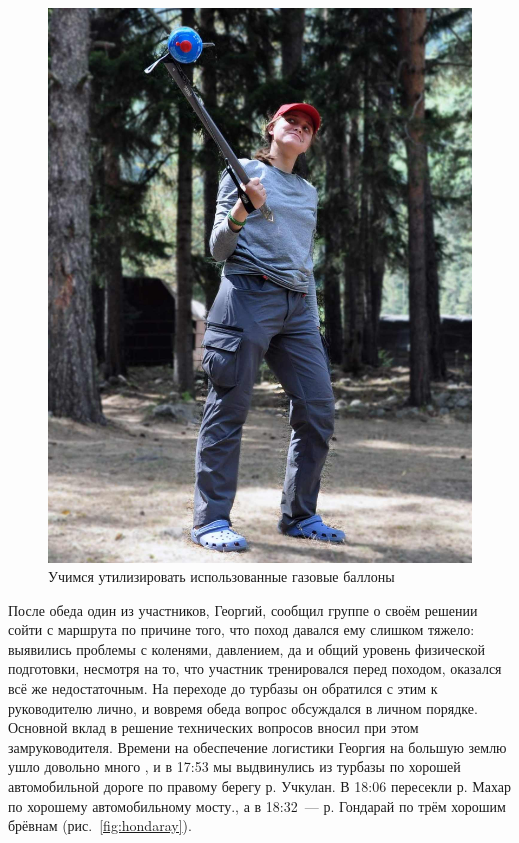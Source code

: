 \begin{figure}[h!]
\begin{minipage}[h]{0.30\linewidth}
		\includegraphics[width=\linewidth]{../pics/DSC_1152.jpg}
	\end{minipage}
	\caption{Учимся утилизировать использованные газовые баллоны \smiley}
	\label{fig:DSC_1150}
\end{figure}

После обеда один из участников, Георгий, сообщил группе о своём решении сойти с маршрута по причине того, что поход давался ему слишком тяжело: выявились проблемы с коленями, давлением, да и общий уровень физической подготовки, несмотря на то, что участник тренировался перед походом, оказался всё же недостаточным. На переходе до турбазы он обратился с этим к руководителю лично, и вовремя обеда вопрос обсуждался в личном порядке. Основной вклад в решение технических вопросов вносил при этом замруководителя. Времени на обеспечение логистики Георгия на большую землю ушло довольно много , и в 17:53 мы выдвинулись из турбазы по хорошей автомобильной дороге по правому берегу р. Учкулан. В 18:06 пересекли р. Махар по хорошему автомобильному мосту., а в 18:32~--- р. Гондарай по трём хорошим брёвнам (рис.~\ref{fig:hondaray}).

